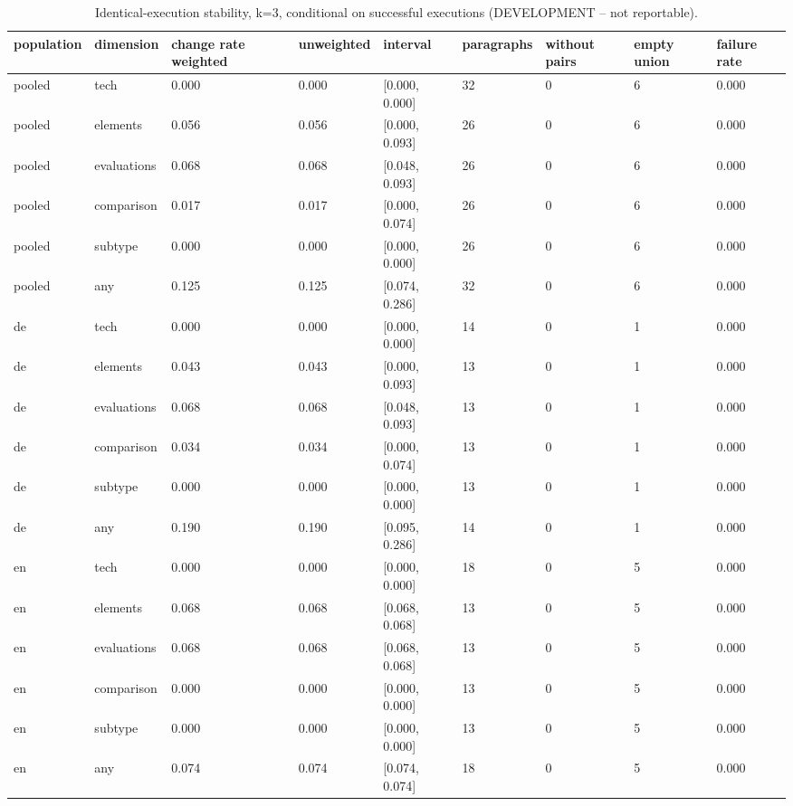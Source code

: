 \begin{table}[htbp]
\centering
\small
\begin{tabular}{lllllllll}
\toprule
\textbf{population} & \textbf{dimension} & \textbf{change rate weighted} & \textbf{unweighted} & \textbf{interval} & \textbf{paragraphs} & \textbf{without pairs} & \textbf{empty union} & \textbf{failure rate} \\
\midrule
pooled & tech & 0.000 & 0.000 & [0.000, 0.000] & 32 & 0 & 6 & 0.000 \\
pooled & elements & 0.056 & 0.056 & [0.000, 0.093] & 26 & 0 & 6 & 0.000 \\
pooled & evaluations & 0.068 & 0.068 & [0.048, 0.093] & 26 & 0 & 6 & 0.000 \\
pooled & comparison & 0.017 & 0.017 & [0.000, 0.074] & 26 & 0 & 6 & 0.000 \\
pooled & subtype & 0.000 & 0.000 & [0.000, 0.000] & 26 & 0 & 6 & 0.000 \\
pooled & any & 0.125 & 0.125 & [0.074, 0.286] & 32 & 0 & 6 & 0.000 \\
de & tech & 0.000 & 0.000 & [0.000, 0.000] & 14 & 0 & 1 & 0.000 \\
de & elements & 0.043 & 0.043 & [0.000, 0.093] & 13 & 0 & 1 & 0.000 \\
de & evaluations & 0.068 & 0.068 & [0.048, 0.093] & 13 & 0 & 1 & 0.000 \\
de & comparison & 0.034 & 0.034 & [0.000, 0.074] & 13 & 0 & 1 & 0.000 \\
de & subtype & 0.000 & 0.000 & [0.000, 0.000] & 13 & 0 & 1 & 0.000 \\
de & any & 0.190 & 0.190 & [0.095, 0.286] & 14 & 0 & 1 & 0.000 \\
en & tech & 0.000 & 0.000 & [0.000, 0.000] & 18 & 0 & 5 & 0.000 \\
en & elements & 0.068 & 0.068 & [0.068, 0.068] & 13 & 0 & 5 & 0.000 \\
en & evaluations & 0.068 & 0.068 & [0.068, 0.068] & 13 & 0 & 5 & 0.000 \\
en & comparison & 0.000 & 0.000 & [0.000, 0.000] & 13 & 0 & 5 & 0.000 \\
en & subtype & 0.000 & 0.000 & [0.000, 0.000] & 13 & 0 & 5 & 0.000 \\
en & any & 0.074 & 0.074 & [0.074, 0.074] & 18 & 0 & 5 & 0.000 \\
\bottomrule
\end{tabular}
\caption{Identical-execution stability, k=3, conditional on successful executions (DEVELOPMENT -- not reportable).}
\end{table}
